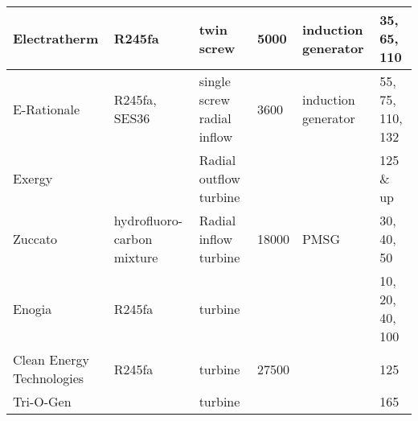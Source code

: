 \begin{table}
\begin{tabular}[c]{|p{3.0cm}|p{3.0cm}|p{3.0cm}|p{1.5cm}|p{3.0cm}|p{2.0cm}|}
	Electratherm              & R245fa                         & twin screw                & 5000           & induction generator & 35, 65, 110 \\ \hline
	E-Rationale               & R245fa, SES36                  & single screw radial inflow & 3600          & induction generator & 55, 75, 110, 132 \\ \hline
	Exergy                    &                                & Radial outflow turbine    &            &                     & 125 \& up \\ \hline
	Zuccato                   & hydrofluoro-carbon mixture      & Radial inflow turbine     & 18000          & PMSG                & 30, 40, 50 \\ \hline
	Enogia                    & R245fa                         & turbine                   &            &                     & 10, 20, 40, 100\\ \hline
	Clean Energy Technologies & R245fa                         & turbine                   & 27500          &                     & 125 \\ \hline
	Tri-O-Gen                 &                                & turbine                   &            &                     & 165 \\ \hline

\end{tabular}
\end{table}

